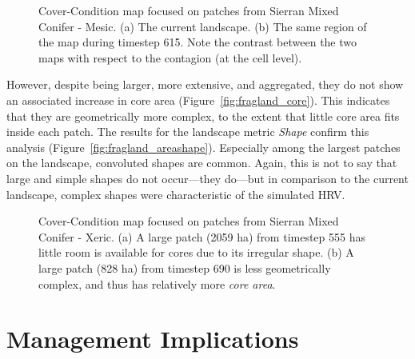 \begin{figure}[!htbp]
  \centering
  \caption{Cover-Condition map focused on patches from Sierran Mixed Conifer - Mesic. (a) The current landscape. (b) The same region of the map during timestep 615. Note the contrast between the two maps with respect to the contagion (at the cell level).} 
  \label{fig:patchmaps3}
\end{figure}

However, despite being larger, more extensive, and aggregated, they do not show an associated increase in core area (Figure~\ref{fig:fragland_core}). This indicates that they are geometrically more complex, to the extent that little core area fits inside each patch. The results for the landscape metric \emph{Shape} confirm this analysis (Figure~\ref{fig:fragland_areashape}). Especially among the largest patches on the landscape, convoluted shapes are common. Again, this is not to say that large and simple shapes do not occur---they do---but in comparison to the current landscape, complex shapes were characteristic of the simulated HRV.

\begin{figure}[!htbp]
  \centering
  \caption{Cover-Condition map focused on patches from Sierran Mixed Conifer - Xeric. (a) A large patch (2059 ha) from timestep 555 has little room is available for cores due to its irregular shape. (b) A large patch (828 ha) from timestep 690 is less geometrically complex, and thus has relatively more \emph{core area}.} 
  \label{fig:patchmaps4}
\end{figure}

\clearpage
\section{Management Implications}

